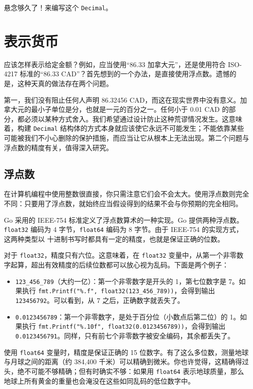 悬念够久了！来编写这个 \texttt{Decimal}。

\section{表示货币}

应该怎样表示给定金额？例如，应当使用“86.33 加拿大元”，还是使用符合 ISO-4217 标准的“86.33 CAD”？首先想到的一个办法，是直接使用浮点数。遗憾的是，这种天真的做法存在两个问题。

第一，我们没有阻止任何人声明 86.32456 CAD，而这在现实世界中没有意义。加拿大元的最小子单位是分，也就是一元的百分之一。任何小于 0.01 CAD 的部分，都必须以某种方式舍入。我们希望通过设计防止这种荒谬情况发生。这意味着，构建 \texttt{Decimal} 结构体的方式本身就应该使它永远不可能发生；不能依靠某些可能被我们不小心删除的保护措施，而应当让它从根本上无法出现。第二个问题与浮点数的精度有关，值得深入研究。

\subsection{浮点数}

在计算机编程中使用整数很直接，你只需注意它们会不会太大。使用浮点数则完全不同：只要用了浮点数，就始终应当假设得到的结果不会与你预期的完全相同。

Go 采用的 IEEE-754 标准定义了浮点数算术的一种实现。Go 提供两种浮点数。\texttt{float32} 编码为 4 字节，\texttt{float64} 编码为 8 字节。由于 IEEE-754 的实现方式，这两种类型以
十进制书写时都具有一定的精度，也就是保证正确的位数。

对于 \texttt{float32}，精度只有六位。这意味着，在 \texttt{float32} 变量中，从第一个非零数字起算，超出有效精度的后续位数都可以放心视为乱码。下面是两个例子：

\begin{itemize}
\item \texttt{123\_456\_789}（大约一亿）：第一个非零数字是开头的 1，第七位数字是 7。如果执行 \texttt{fmt.Printf("\%.f", float32(123\_456\_789))}，会得到输出 \texttt{123456792}。可以看到，从 7 之后，正确数字就丢失了。

\item \texttt{0.0123456789}：第一个非零数字，是处于百分位（小数点后第二位）的 1。如果执行 \texttt{fmt.Printf("\%.10f", float32(0.0123456789))}，会得到输出 \texttt{0.0123456791}。同样，只有前七个非零数字被安全编码，其余都丢失了。
\end{itemize}

使用 \texttt{float64} 变量时，精度是保证正确的 15 位数字。有了这么多位数，测量地球与月球之间的距离（约 384,400 千米）可以精确到微米。你也许觉得，这精确得过头，绝不可能不够精确；但有时确实不够：如果用 \texttt{float64} 表示地球质量，那么地球上所有黄金的重量也会淹没在这些如同乱码的低位数字中。


